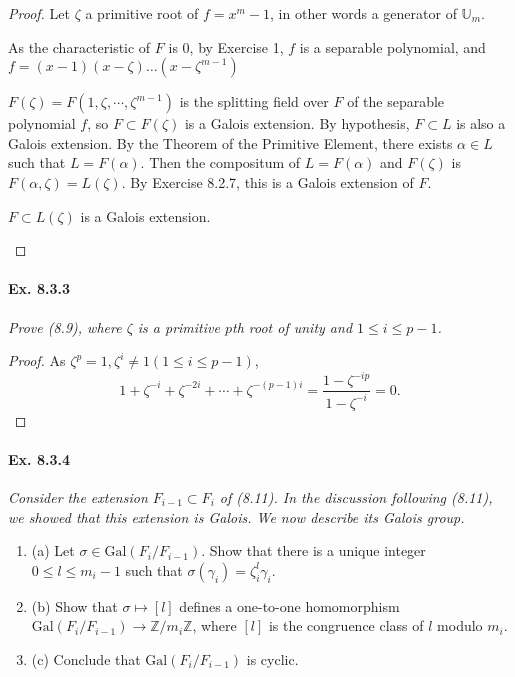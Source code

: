 \documentclass[11pt,a4paper]{article}
\newcommand{\be} {\begin{enumerate}}
\newcommand{\ee} {\end{enumerate}}
\newcommand{\Z}{\mathbb{Z}}
\newcommand{\Gal}{\mathrm{Gal}}
\begin{document}
\begin{proof}
Let $\zeta$ a primitive root of $f = x^m-1$, in other words a generator of $\mathbb{U}_m$.

As the characteristic of $F$ is 0, by Exercise 1, $f$ is a separable polynomial, and $f=(x-1)(x-\zeta)\ldots(x-\zeta^{m-1})$

$F(\zeta) = F(1,\zeta,\cdots,\zeta^{m-1})$ is the splitting field over $F$ of the separable polynomial $f$, so $F\subset F(\zeta)$ is a Galois extension. By hypothesis, $F\subset L$ is also a Galois extension. By the Theorem of the Primitive Element, there exists $\alpha\in L$ such that $L=F(\alpha)$. Then the compositum of $L=F(\alpha)$ and $F(\zeta)$  is $F(\alpha,\zeta) = L(\zeta)$. By Exercise 8.2.7, this is a Galois extension of $F$.
\begin{center}
$F \subset L(\zeta)$ is a Galois extension.
\end{center}
\end{proof}

\paragraph{Ex. 8.3.3}

{\it Prove (8.9), where $\zeta$ is a primitive $p$th root of unity and $1\leq i \leq p-1$.
}

\begin{proof}
As $\zeta^p=1,\zeta^i\neq 1 (1\leq i \leq p-1)$,
$$1+\zeta^{-i}+\zeta^{-2i}+\cdots+\zeta^{-(p-1)i} = \frac{1-\zeta^{-ip}}{1-\zeta^{-i}} = 0.$$
\end{proof}


\paragraph{Ex. 8.3.4}

{\it Consider the extension $F_{i-1} \subset F_i$ of (8.11). In the discussion following (8.11), we showed that this extension is Galois. We now describe its Galois group.
\be
\item[(a)] Let $\sigma \in \Gal(F_i/F_{i-1})$. Show that there is a unique integer $0 \leq l \leq m_i-1$ such that $\sigma(\gamma_i) = \zeta_i^l \gamma_i$.
\item[(b)] Show that $\sigma \mapsto [l]$ defines a one-to-one homomorphism $\Gal(F_i/F_{i-1}) \to \Z/m_i\Z$, where $[l]$ is the congruence class of $l$ modulo $m_i$.
\item[(c)] Conclude that $\Gal(F_i/F_{i-1})$ is cyclic.
\ee
}
\end{document}

